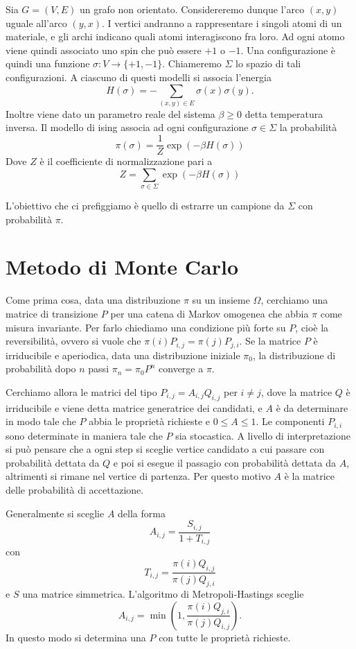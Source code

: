 \documentclass[]{marticle}
\begin{document}
Sia $G=(V,E)$ un grafo non orientato. Considereremo dunque l'arco $(x,y)$ uguale
all'arco $(y,x)$. I vertici andranno a rappresentare i singoli atomi di un
materiale, e gli archi indicano quali atomi interagiscono fra loro. Ad ogni
atomo viene quindi associato uno spin che pu\`o essere $+1$ o $-1$. Una
configurazione \`e quindi una funzione $\sigma\colon V \rightarrow \{+1, -1\}$.
Chiameremo $\Sigma$ lo spazio di tali configurazioni.  A ciascuno di questi
modelli si associa l'energia 
\[
    H(\sigma) = -\sum_{(x,y)\in E} \sigma(x)\sigma(y).
\]
Inoltre viene dato un parametro reale del sistema $\beta \geq 0$ detta
temperatura inversa. Il modello di ising associa ad ogni configurazione $\sigma
\in \Sigma$ la probabilit\`a
\[
    \pi(\sigma) = \frac{1}{Z} \exp(-\beta H(\sigma))
\]
Dove $Z$ \`e il coefficiente di normalizzazione pari a
\[
    Z = \sum_{\sigma \in \Sigma} \exp(-\beta H(\sigma))
\]

L'obiettivo che ci prefiggiamo \`e quello di estrarre un campione da
$\Sigma$ con probabilit\`a $\pi$.

\section{Metodo di Monte Carlo}

Come prima cosa, data una distribuzione $\pi$ su un insieme $\Omega$, cerchiamo
una matrice di transizione $P$ per una catena di Markov omogenea che abbia
$\pi$ come misura invariante. Per farlo chiediamo una condizione pi\`u forte su
$P$, cio\`e la reversibilit\`a, ovvero si vuole che $\pi (i)P_{i,j}=\pi
(j)P_{j,i}$. Se la matrice $P$ \`e irriducibile e aperiodica, data una
distribuzione iniziale $\pi_0$, la distribuzione di probabilit\`a dopo $n$ passi
$\pi_n = \pi_0 P^n$ converge a $\pi$.

Cerchiamo allora le matrici del tipo $P_{i,j} = A_{i,j} Q_{i,j}$ per $i\neq j$,
dove la matrice $Q$ \`e irriducibile e viene detta matrice generatrice dei
candidati, e $A$ \`e da determinare in modo tale che $P$ abbia le propriet\`a
richieste e $0\leq A \leq 1$. Le componenti $P_{i,i}$ sono determinate in
maniera tale che $P$ sia stocastica.  A livello di interpretazione si pu\`o
pensare che a ogni step si sceglie vertice candidato a cui passare con
probabilit\`a dettata da $Q$ e poi si esegue il passagio con probabilit\`a
dettata da $A$, altrimenti si rimane nel vertice di partenza. Per questo motivo
$A$ \`e la matrice delle probabilit\`a di accettazione. 

Generalmente si sceglie $A$ della forma
\[
    A_{i,j} = \frac{S_{i,j}}{1+T_{i,j}}
\]
con
\[
    T_{i, j} = \frac{\pi(i) Q_{i,j}}{\pi(j) Q_{j,i}}
\]
e $S$ una matrice simmetrica.
L'algoritmo di Metropoli-Hastings sceglie
\[
    A_{i,j} = \min \left(1, \frac{\pi(i)Q_{j,i}}{\pi(j)Q_{i,j}}\right).
\]
 In questo modo si determina una $P$ con tutte le propriet\`a richieste.
\end{document}
